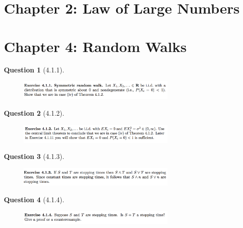 \documentclass[11pt]{article}
\theoremstyle{plain}
\theoremstyle{quest}
\newtheorem*{question}{Question}
\begin{document}
\newpage

\section{Chapter 2: Law of Large Numbers}

\newpage

\section{Chapter 4: Random Walks}

\begin{question}[4.1.1]
\hfill
\begin{figure}[h!]
  \centering
    \includegraphics[width=0.7\textwidth]{d-4-1-1.png}
\end{figure}
\end{question}

\newpage

\begin{question}[4.1.2]
\hfill
\begin{figure}[h!]
  \centering
    \includegraphics[width=0.7\textwidth]{d-4-1-2.png}
\end{figure}
\end{question}

\newpage

\begin{question}[4.1.3]
\hfill
\begin{figure}[h!]
  \centering
    \includegraphics[width=0.7\textwidth]{d-4-1-3.png}
\end{figure}
\end{question}

\newpage

\begin{question}[4.1.4]
\hfill
\begin{figure}[h!]
  \centering
    \includegraphics[width=0.7\textwidth]{d-4-1-4.png}
\end{figure}
\end{question}
\end{document}
